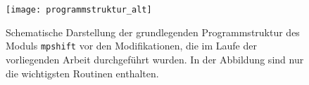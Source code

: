 \newpage
\begin{figure}[ht!]
\centering
\texttt{[image: programmstruktur\_alt]}
\captionsetup{figurewithin = chapter}
\captionsetup{font=small, labelfont=bf}\caption[Grundlegende Programmstruktur]{Schematische Darstellung der grundlegenden Programmstruktur des Moduls \texttt{mpshift} vor den Modifikationen, die im Laufe der vorliegenden Arbeit durchgeführt wurden. In der Abbildung sind nur die wichtigsten Routinen enthalten.}
\label{abb:programmstrukur_alt}
\end{figure}
